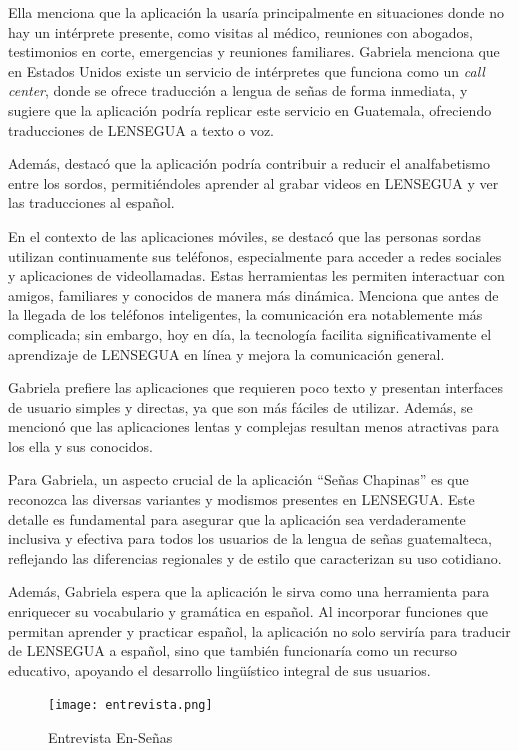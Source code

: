 Ella menciona que la aplicación la usaría principalmente en situaciones donde no hay un intérprete presente, como visitas al médico, reuniones con abogados, testimonios en corte, emergencias y reuniones familiares. Gabriela menciona que en Estados Unidos existe un servicio de intérpretes que funciona como un \textit{call center}, donde se ofrece traducción a lengua de señas de forma inmediata, y sugiere que la aplicación podría replicar este servicio en Guatemala, ofreciendo traducciones de LENSEGUA a texto o voz.

Además, destacó que la aplicación podría contribuir a reducir el analfabetismo entre los sordos, permitiéndoles aprender al grabar videos en LENSEGUA y ver las traducciones al español. 

En el contexto de las aplicaciones móviles, se destacó que las personas sordas utilizan continuamente sus teléfonos, especialmente para acceder a redes sociales y aplicaciones de videollamadas. Estas herramientas les permiten interactuar con amigos, familiares y conocidos de manera más dinámica. Menciona que antes de la llegada de los teléfonos inteligentes, la comunicación era notablemente más complicada; sin embargo, hoy en día, la tecnología facilita significativamente el aprendizaje de LENSEGUA en línea y mejora la comunicación general. 

Gabriela prefiere las aplicaciones que requieren poco texto y presentan interfaces de usuario simples y directas, ya que son más fáciles de utilizar. Además, se mencionó que las aplicaciones lentas y complejas resultan menos atractivas para los ella y sus conocidos.

Para Gabriela, un aspecto crucial de la aplicación ``Señas Chapinas'' es que reconozca las diversas variantes y modismos presentes en LENSEGUA. Este detalle es fundamental para asegurar que la aplicación sea verdaderamente inclusiva y efectiva para todos los usuarios de la lengua de señas guatemalteca, reflejando las diferencias regionales y de estilo que caracterizan su uso cotidiano.

Además, Gabriela espera que la aplicación le sirva como una herramienta para enriquecer su vocabulario y gramática en español. Al incorporar funciones que permitan aprender y practicar español, la aplicación no solo serviría para traducir de LENSEGUA a español, sino que también funcionaría como un recurso educativo, apoyando el desarrollo lingüístico integral de sus usuarios.


\begin{figure} [H]
    \centering
    \texttt{[image: entrevista.png]}
    \caption{Entrevista En-Señas}
    \label{fig:enter-label}
\end{figure}

